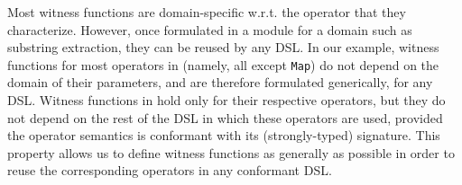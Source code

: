 \begin{table}[t]
    \caption{Witness functions $\omega_L(\spec) \mapsto \spec'$ for
        the list parameter $L$ of various FlashExtract instantiations of the $\mathsf{Map}\left(F,\,L\right)$ operator,
    where $\spec$ is a \emph{prefix spec} $\state \tospec \mathbf{?} \sqsupseteq \vec{v}$. }
    \label{tbl:wfs:flashextract}
\end{table}

Most witness functions are domain-specific w.r.t.  the operator that they characterize.
However, once formulated in a module for a domain such as substring extraction, they can be reused by any DSL.
In our example, witness functions for most operators in  (namely, all except \texttt{Map}) do not
depend on the domain of their parameters, and are therefore formulated generically, for any DSL.
Witness functions in  hold only for their respective operators, but they do
not depend on the rest of the DSL in which these operators are used, provided the operator semantics is conformant with
its (strongly-typed) signature.
This property allows us to define witness functions as generally as possible in order to reuse the corresponding
operators in any conformant DSL.
